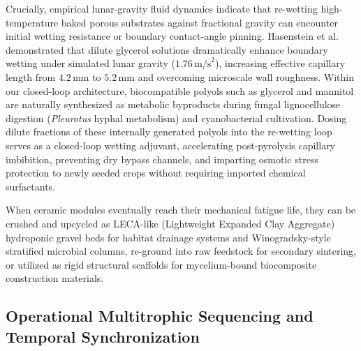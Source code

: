 Crucially, empirical lunar-gravity fluid dynamics indicate that re-wetting high-temperature baked porous substrates against fractional gravity can encounter initial wetting resistance or boundary contact-angle pinning\cite{hasenstein2026assessing}. Hasenstein et al. demonstrated that dilute glycerol solutions dramatically enhance boundary wetting under simulated lunar gravity ($1.76\,\mathrm{m/s}^2$), increasing effective capillary length from $4.2\,\mathrm{mm}$ to $5.2\,\mathrm{mm}$ and overcoming microscale wall roughness\cite{hasenstein2026assessing}. Within our closed-loop architecture, biocompatible polyols such as glycerol and mannitol are naturally synthesized as metabolic byproducts during fungal lignocellulose digestion (\textit{Pleurotus} hyphal metabolism) and cyanobacterial cultivation\cite{hasenstein2026assessing,grimm2018mushroom,verseux2022editorial}. Dosing dilute fractions of these internally generated polyols into the re-wetting loop serves as a closed-loop wetting adjuvant, accelerating post-pyrolysis capillary imbibition, preventing dry bypass channels, and imparting osmotic stress protection to newly seeded crops without requiring imported chemical surfactants\cite{hasenstein2026assessing}.

When ceramic modules eventually reach their mechanical fatigue life, they can be crushed and upcycled as LECA-like (Lightweight Expanded Clay Aggregate) hydroponic gravel beds for habitat drainage systems and Winogradsky-style stratified microbial columns, re-ground into raw feedstock for secondary sintering, or utilized as rigid structural scaffolds for mycelium-bound biocomposite construction materials\cite{ming1989lunar,grimm2018mushroom}.

\subsection{Operational Multitrophic Sequencing and Temporal Synchronization}
\label{subsec:operational_sequencing}

